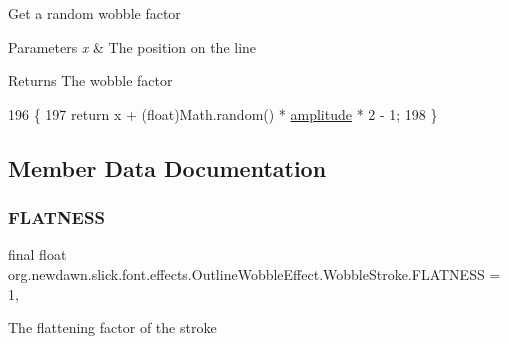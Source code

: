 Get a random wobble factor


\begin{DoxyParams}{Parameters}
{\em x} & The position on the line \\
\hline
\end{DoxyParams}
\begin{DoxyReturn}{Returns}
The wobble factor 
\end{DoxyReturn}

\begin{DoxyCode}
196                                          \{
197             \textcolor{keywordflow}{return} x + (float)Math.random() * \mbox{\hyperlink{classorg_1_1newdawn_1_1slick_1_1font_1_1effects_1_1_outline_wobble_effect_a6797d66a3cfb14ca9b2e04bad9f2979e}{amplitude}} * 2 - 1;
198         \}
\end{DoxyCode}


\subsection{Member Data Documentation}
\mbox{\label{classorg_1_1newdawn_1_1slick_1_1font_1_1effects_1_1_outline_wobble_effect_1_1_wobble_stroke_abb70d0bc0ea08d8be8f328ce24eaf8e5}} 
\subsubsection{\texorpdfstring{F\+L\+A\+T\+N\+E\+SS}{FLATNESS}}
{\footnotesize\ttfamily final float org.\+newdawn.\+slick.\+font.\+effects.\+Outline\+Wobble\+Effect.\+Wobble\+Stroke.\+F\+L\+A\+T\+N\+E\+SS = 1\hspace{0.3cm}{\ttfamily [static]}, {\ttfamily [private]}}

The flattening factor of the stroke 